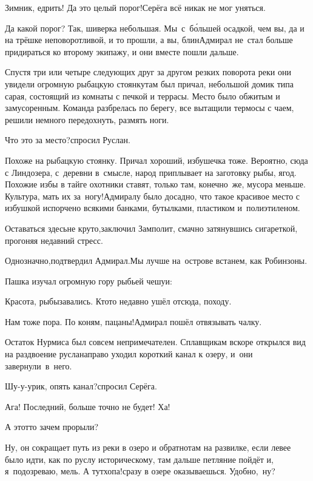 \diagdash Зимник, едрить! Да это целый порог!\mdash Серёга всё никак не мог уняться.

\diagdash Да какой порог? Так, шиверка небольшая. Мы~с~б\'{о}льшей осадкой, чем вы, да и на трёшке неповоротливой, и то прошли, а вы, блин\myldots{}\mdash Адмирал не~стал больше придираться ко второму экипажу, и они вместе пошли дальше. 

Спустя три или четыре следующих друг за другом резких поворота реки они увидели огромную рыбацкую стоянку\mdash там был причал, небольшой домик типа сарая, состоящий из комнаты с печкой и террасы. Место было обжитым и замусоренным. Команда разбрелась по берегу, все вытащили термосы с чаем, решили немного передохнуть, размять ноги.

\diagdash Что это за место?\mdash спросил Руслан.

\diagdash Похоже на рыбацкую стоянку. Причал хороший, избушечка тоже. Вероятно, сюда с Линдозера, с~деревни в~смысле, народ приплывает на заготовку рыбы, ягод. Похожие избы в тайге охотники ставят, только там, конечно~же, мусора меньше. Культура, мать их за~ногу!\mdash Адмиралу было досадно, что такое красивое место с избушкой испорчено всякими банками, бутылками, пластиком и~полиэтиленом.

\diagdash Оставаться здесь\mdash не круто,\mdash заключил Замполит, смачно затянувшись сигареткой, прогоняя недавний стресс.

\diagdash Однозначно,\mdash подтвердил Адмирал.\mdash Мы лучше на~острове встанем, как Робинзоны.

Пашка изучал огромную гору рыбьей чешуи:

\diagdash Красота, рыбы\mdash завались. Кто\sdash то недавно ушёл отсюда, походу.

\diagdash Нам тоже пора. По коням, пацаны!\mdash Адмирал пошёл отвязывать чалку.

Остаток Нурмиса был совсем непримечателен. Сплавщикам вскоре открылся вид на раздвоение русла\mdash направо уходил короткий канал к озеру, и~они завернули~в~него.

\diagdash Шу-у-урик, опять канал?\mdash спросил Серёга.

\diagdash Ага! Последний, больше точно не будет! Ха!

\diagdash А этот\sdash то зачем прорыли? 

\diagdash Ну, он сокращает путь из реки в озеро и обратно\mdash там на развилке, если левее было идти, как по руслу историческому, там дальше петляние пойдёт и, я~подозреваю, мель. А тут\mdash хопа!\mdash сразу в озере оказываешься. Удобно,~ну?

